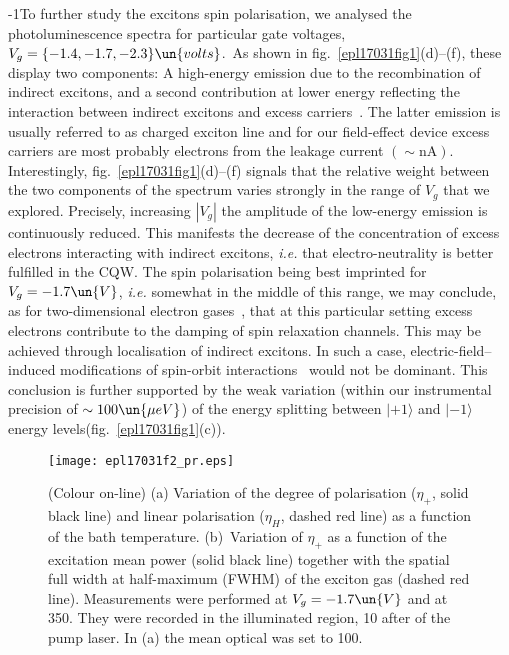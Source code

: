 \documentclass[doublecol,final]{epl2}
\begin{document}
\looseness-1To further study the excitons spin polarisation, we analysed the photoluminescence spectra for particular gate voltages, $V_g= \{-1.4,-1.7,-2.3\}\un{volts}$.~As shown in fig.~\ref{epl17031fig1}(d)--(f), these display two components: A high-energy emission due to the recombination of indirect excitons, and a second contribution at lower energy reflecting the interaction between indirect excitons and excess carriers~\cite{epl17031bib17}. The latter emission is usually referred to as charged exciton line and for our field-effect device excess carriers are most probably electrons from the leakage current $(\sim\text{nA})$. Interestingly, fig.~\ref{epl17031fig1}(d)--(f) signals that the relative weight between the two components of the spectrum varies strongly in the range of $V_{g}$ that we explored. Precisely, increasing $|V_g|$ the amplitude of the low-energy emission is continuously reduced. This manifests the decrease of the concentration of excess electrons interacting with indirect excitons, \textit{i.e.} that electro-neutrality is better fulfilled in the CQW. The spin polarisation being best imprinted for $V_{g}= -1.7\un{V}$, \textit{i.e.} somewhat in the middle of this range, we may conclude, as for two-dimensional electron gases~\cite{epl17031bib18}, that at this particular setting excess electrons contribute to the damping of spin relaxation channels. This may be achieved through localisation of indirect excitons. In such a case, electric-field--induced modifications of spin-orbit interactions~\cite{epl17031bib4,epl17031bib19} would not be dominant. This conclusion is further supported by the weak variation (within our instrumental precision of $\sim 100\un{\mu eV}$) of the energy splitting between $|+1\rangle$ and $|-1\rangle$ energy levels\break (fig.~\ref{epl17031fig1}(c)).

\begin{figure}%
\centering\texttt{[image: epl17031f2\_pr.eps]}
\caption{(Colour on-line) (a) Variation of the degree of  polarisation ($\eta_{+}$, solid black line) and linear polarisation ($\eta_{H}$, dashed red line) as a function of the bath temperature. (b)~Variation of $\eta_{+}$ as a function of the excitation mean power (solid black line) together with the spatial full width at half-maximum (FWHM) of the exciton gas (dashed red line). Measurements were performed at $V_g= -1.7\un{V}$ and at 350. They were recorded in the illuminated region, 10 after  of the pump laser. In (a) the mean optical was set to 100.}
\label{epl17031fig2}
\end{figure}
\end{document}
